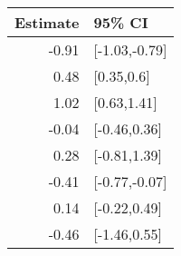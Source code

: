 \begin{tabular}{rl}
  \hline
Estimate & 95\% CI \\ 
  \hline
-0.91 & [-1.03,-0.79] \\ 
  0.48 & [0.35,0.6] \\ 
  1.02 & [0.63,1.41] \\ 
  -0.04 & [-0.46,0.36] \\ 
  0.28 & [-0.81,1.39] \\ 
  -0.41 & [-0.77,-0.07] \\ 
  0.14 & [-0.22,0.49] \\ 
  -0.46 & [-1.46,0.55] \\ 
   \hline
\end{tabular}

